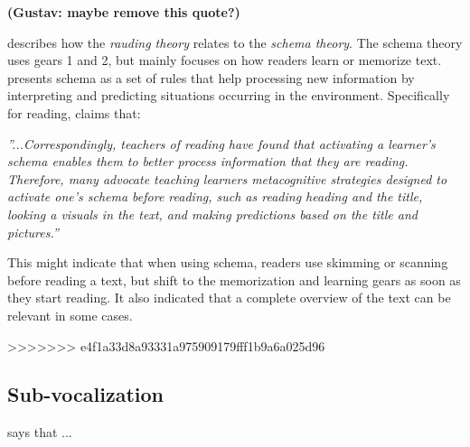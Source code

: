 \textbf{(Gustav: maybe remove this quote?)}

\citeauthor{carver_reading_1992} describes how the \textit{rauding theory} relates to the \textit{schema theory}. The schema theory uses gears 1 and 2, but mainly focuses on how readers learn or memorize text.  presents schema as a set of rules that help processing new information by interpreting and predicting situations occurring in the environment. Specifically for reading, \citeauthor{widmayer_schema_2005} claims that:

 \emph{''...Correspondingly, teachers of reading have found that activating a learner's schema enables them to better process information that they are reading. Therefore, many advocate teaching learners metacognitive strategies designed to activate one's schema before reading, such as reading heading and the title, looking a visuals in the text, and making predictions based on the title and pictures.''}

This might indicate that when using schema, readers use skimming or scanning before reading a text, but shift to the memorization and learning gears as soon as they start reading. It also indicated that a complete overview of the text can be relevant in some cases.

>>>>>>> e4f1a33d8a93331a975909179fff1b9a6a025d96

\subsection{Sub-vocalization}
 says that ...
